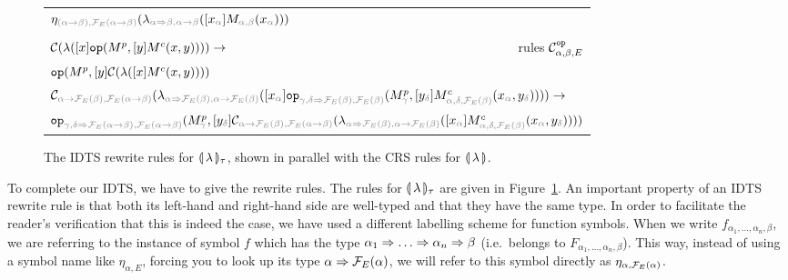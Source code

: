 \begin{sidewaysfigure}
\begin{tabular}{lr}
  \multicolumn{2}{l}{$\eta_{\typehint{(\alpha \to \beta), \FF_E(\alpha \to
    \beta)}} (\lambda_{\typehint{\alpha \To \beta, \alpha \to \beta}}([x_{\typehint\alpha}] M_{\typehint{\alpha, \beta}}(x_{\typehint\alpha})))$} \\
  \\
  $\mathcal{C} (\lambda([x] \mathtt{op} (M^p, [y]M^c(x, y)))) \to$ & rules $\mathcal{C}^{\mathtt{op}}_{\alpha, \beta, E}$ \\
  $\mathtt{op} (M^p, [y] \mathcal{C} (\lambda([x] M^c(x, y))))$ & \\
  \multicolumn{2}{l}{$\CC_{\typehint{\alpha \to \FF_E(\beta), \FF_E(\alpha \to \beta)}} (\lambda_{\typehint{\alpha \To \FF_E(\beta), \alpha \to \FF_E(\beta)}}([x_{\typehint\alpha}] \op{op}_{\typehint{\gamma, \delta \To \FF_E(\beta), \FF_E(\beta)}} (M^p_{\typehint\gamma}, [y_{\typehint\delta}]M^c_{\typehint{\alpha, \delta, \FF_E(\beta)}}(x_{\typehint\alpha}, y_{\typehint\delta})))) \to$} \\
  \multicolumn{2}{l}{$\op{op}_{\typehint{\gamma, \delta \To \FF_E(\alpha \to \beta), \FF_E(\alpha \to \beta)}} (M^p_{\typehint\gamma}, [y_{\typehint\delta}] \CC_{\typehint{\alpha \to \FF_E(\beta), \FF_E(\alpha \to \beta)}} (\lambda_{\typehint{\alpha \To \FF_E(\beta), \alpha \to \FF_E(\beta)}}([x_{\typehint\alpha}] M^c_{\typehint{\alpha, \delta, \FF_E(\beta)}}(x_{\typehint\alpha}, y_{\typehint\delta}))))$}
  \end{tabular}
  
  \caption{\label{fig:tau-types} The IDTS rewrite rules for
    $\llparenthesis \, \lambda \, \rrparenthesis_\tau$, shown in parallel with the CRS rules for
    $\llparenthesis \, \lambda \, \rrparenthesis$.}
  
\end{sidewaysfigure}

To complete our IDTS, we have to give the rewrite rules. The rules for
$\llparenthesis \, \lambda \, \rrparenthesis_\tau$ are given in Figure~\ref{fig:tau-types}. An
important property of an IDTS rewrite rule is that both its left-hand and
right-hand side are well-typed and that they have the same type. In order
to facilitate the reader's verification that this is indeed the case, we
have used a different labelling scheme for function symbols. When we write
$f_{\alpha_1,\ldots,\alpha_n,\beta}$, we are referring to the instance of
symbol $f$ which has the type $\alpha_1 \Rightarrow \ldots \Rightarrow \alpha_n \Rightarrow \beta$
(i.e.\ belongs to $F_{\alpha_1,\ldots,\alpha_n,\beta}$). This way, instead
of using a symbol name like $\eta_{\alpha,E}$, forcing you to look up its
type $\alpha \Rightarrow \mathcal{F}_E(\alpha)$, we will refer to this symbol directly as
$\eta_{\alpha,\mathcal{F}_E(\alpha)}$.

